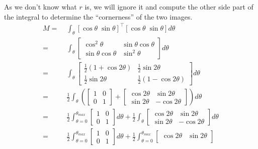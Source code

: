 \documentclass[11pt,english]{article}
\begin{document}
\begin{enumerate}
As we don't know what $r$ is, we will ignore it and compute the other side part of the integral to
determine the ``cornerness'' of the two images. 
\begin{align*}
    M =&\; \int_{\theta}[\cos\theta\;\sin\theta]^\top[\cos\theta\;\sin\theta] d\theta \\
    =&\; \int_{\theta}
        \begin{bmatrix}
            \cos^2 \theta & \sin\theta \cos\theta \\
            \sin\theta \cos\theta & \sin^2 \theta
        \end{bmatrix} d\theta \\
    =&\; \int_{\theta}
        \begin{bmatrix}
            \frac{1}{2} (1 + \cos 2\theta) & \frac{1}{2}\sin2\theta \\
            \frac{1}{2}\sin2\theta & \frac{1}{2} (1 - \cos 2\theta)
        \end{bmatrix} d\theta \\
    =&\; \frac{1}{2} \int_{\theta} \left(
        \begin{bmatrix}
            1 & 0 \\
            0 & 1
        \end{bmatrix} + 
        \begin{bmatrix}
            \cos 2\theta & \sin 2\theta \\
            \sin 2\theta & -\cos 2\theta
        \end{bmatrix} \right) d\theta \\
    =&\; \frac{1}{2} \int_{\theta=0}^{\theta_{max}}
        \begin{bmatrix}
            1 & 0 \\
            0 & 1
        \end{bmatrix} d\theta + \frac{1}{2} \int_{\theta}
        \begin{bmatrix}
            \cos 2\theta & \sin 2\theta \\
            \sin 2\theta & -\cos 2\theta
        \end{bmatrix} d\theta \\ 
    =&\; \frac{1}{2} \int_{\theta=0}^{\theta_{max}} 
        \begin{bmatrix}
            1 & 0 \\
            0 & 1
        \end{bmatrix} d\theta + \frac{1}{2} \int_{\theta=0}^{\theta_{max}}
        \begin{bmatrix}
            \cos 2\theta & \sin 2\theta \\

\end{bmatrix}
\end{align*}
\end{enumerate}
\end{document}
